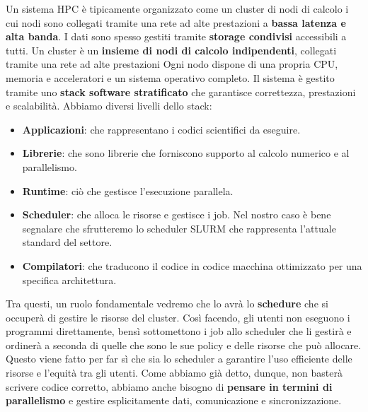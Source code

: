 Un sistema HPC è tipicamente organizzato come un cluster di nodi di calcolo i cui nodi sono collegati tramite una rete ad alte prestazioni a \textbf{bassa latenza e alta banda}. I dati sono spesso gestiti tramite \textbf{storage condivisi} accessibili a tutti.
Un cluster è un \textbf{insieme di nodi di calcolo indipendenti}, collegati tramite una rete ad alte prestazioni
Ogni nodo dispone di una propria CPU, memoria e acceleratori e un sistema operativo completo.
Il sistema è gestito tramite uno \textbf{stack software stratificato} che garantisce correttezza, prestazioni e scalabilità. Abbiamo diversi livelli dello stack:
\begin{itemize}
    \item \textbf{Applicazioni}: che rappresentano i codici scientifici da eseguire.
    \item \textbf{Librerie}: che sono librerie che forniscono supporto al calcolo numerico e al parallelismo.
    \item \textbf{Runtime}: ciò che gestisce l'esecuzione parallela.
    \item \textbf{Scheduler}: che alloca le risorse e gestisce i job. Nel nostro caso è bene segnalare che sfrutteremo lo scheduler SLURM che rappresenta l'attuale standard del settore.
    \item \textbf{Compilatori}: che traducono il codice in codice macchina ottimizzato per una specifica architettura.
\end{itemize}
Tra questi, un ruolo fondamentale vedremo che lo avrà lo \textbf{schedure} che si occuperà di gestire le risorse del cluster. Così facendo, gli utenti non eseguono i programmi direttamente, bensì sottomettono i job allo scheduler che li gestirà e ordinerà a seconda di quelle che sono le sue policy e delle risorse che può allocare. Questo viene fatto per far sì che sia lo scheduler a garantire l'uso efficiente delle risorse e l'equità tra gli utenti.
Come abbiamo già detto, dunque, non basterà scrivere codice corretto, abbiamo anche bisogno di \textbf{pensare in termini di parallelismo} e gestire esplicitamente dati, comunicazione e sincronizzazione.